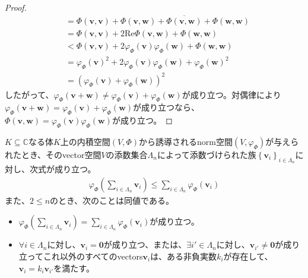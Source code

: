 \documentclass[dvipdfmx]{jsarticle}
\begin{document}
\begin{proof}
\begin{align*}
&= \varPhi\left( \mathbf{v},\mathbf{v} \right) + \varPhi\left( \mathbf{v},\mathbf{w} \right) + \overline{\varPhi\left( \mathbf{v},\mathbf{w} \right)} + \varPhi\left( \mathbf{w},\mathbf{w} \right)\\
&= \varPhi\left( \mathbf{v},\mathbf{v} \right) + 2\mathrm{Re}{\varPhi\left( \mathbf{v},\mathbf{w} \right)} + \varPhi\left( \mathbf{w},\mathbf{w} \right)\\
&< \varPhi\left( \mathbf{v},\mathbf{v} \right) + 2\varphi_{\varPhi}\left( \mathbf{v} \right)\varphi_{\varPhi}\left( \mathbf{w} \right) + \varPhi\left( \mathbf{w},\mathbf{w} \right)\\
&= {\varphi_{\varPhi}\left( \mathbf{v} \right)}^{2} + 2\varphi_{\varPhi}\left( \mathbf{v} \right)\varphi_{\varPhi}\left( \mathbf{w} \right) + {\varphi_{\varPhi}\left( \mathbf{w} \right)}^{2}\\
&= \left( \varphi_{\varPhi}\left( \mathbf{v} \right) + \varphi_{\varPhi}\left( \mathbf{w} \right) \right)^{2}
\end{align*}
したがって、$\varphi_{\varPhi}\left( \mathbf{v} + \mathbf{w} \right) \neq \varphi_{\varPhi}\left( \mathbf{v} \right) + \varphi_{\varPhi}\left( \mathbf{w} \right)$が成り立つ。対偶律により$\varphi_{\varPhi}\left( \mathbf{v} + \mathbf{w} \right) = \varphi_{\varPhi}\left( \mathbf{v} \right) + \varphi_{\varPhi}\left( \mathbf{w} \right)$が成り立つなら、$\varPhi\left( \mathbf{v},\mathbf{w} \right) = \varphi_{\varPhi}\left( \mathbf{v} \right)\varphi_{\varPhi}\left( \mathbf{w} \right)$が成り立つ。
\end{proof}
\begin{thm}\label{2.3.6.8}
$K \subseteq \mathbb{C}$なる体$K$上の内積空間$(V,\varPhi)$から誘導されるnorm空間$\left( V,\varphi_{\varPhi} \right)$が与えられたとき、そのvector空間$V$の添数集合$\varLambda_{n}$によって添数づけられた族$\left\{ \mathbf{v}_{i} \right\}_{i \in \varLambda_{n}}$に対し、次式が成り立つ。
\begin{align*}
\varphi_{\varPhi}\left( \sum_{i \in \varLambda_{n}} \mathbf{v}_{i} \right) \leq \sum_{i \in \varLambda_{n}} {\varphi_{\varPhi}\left( \mathbf{v}_{i} \right)}
\end{align*}
また、$2 \leq n$のとき、次のことは同値である。
\begin{itemize}
\item
  $\varphi_{\varPhi}\left( \sum_{i \in \varLambda_{n}} \mathbf{v}_{i} \right) = \sum_{i \in \varLambda_{n}} {\varphi_{\varPhi}\left( \mathbf{v}_{i} \right)}$が成り立つ。
\item
  $\forall i \in \varLambda_{n}$に対し、$\mathbf{v}_{i} = \mathbf{0}$が成り立つ、または、$\exists i' \in \varLambda_{n}$に対し、$\mathbf{v}_{i'} \neq \mathbf{0}$が成り立ってこれ以外のすべてのvectors$\mathbf{v}_{i}$は、ある非負実数$k_{i}$が存在して、$\mathbf{v}_{i} = k_{i}\mathbf{v}_{i'}$を満たす。
\end{itemize}
\end{thm}
\end{document}

